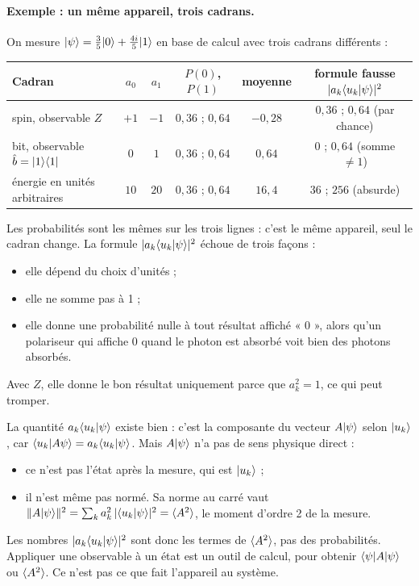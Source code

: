 \paragraph{Exemple : un même appareil, trois cadrans.} On mesure $\lvert \psi\rangle=\tfrac35\lvert 0\rangle+\tfrac{4i}5\lvert 1\rangle$ en base de calcul avec trois cadrans différents :
\begin{center}
\begin{tabular}{lccccc}
\toprule
Cadran & $a_0$ & $a_1$ & $P(0)$, $P(1)$ & moyenne & formule fausse $|a_k\langle u_k\vert \psi\rangle|^2$ \\
\midrule
spin, observable $Z$ & $+1$ & $-1$ & $0{,}36$ ; $0{,}64$ & $-0{,}28$ & $0{,}36$ ; $0{,}64$ (par chance) \\
bit, observable $\hat b=\lvert 1\rangle\langle 1\rvert$ & $0$ & $1$ & $0{,}36$ ; $0{,}64$ & $0{,}64$ & $0$ ; $0{,}64$ (somme $\neq1$) \\
énergie en unités arbitraires & $10$ & $20$ & $0{,}36$ ; $0{,}64$ & $16{,}4$ & $36$ ; $256$ (absurde) \\
\bottomrule
\end{tabular}
\end{center}
Les probabilités sont les mêmes sur les trois lignes : c'est le même appareil, seul le cadran change. La formule $|a_k\langle u_k\vert \psi\rangle|^2$ échoue de trois façons :
\begin{itemize}
\item elle dépend du choix d'unités ;
\item elle ne somme pas à 1 ;
\item elle donne une probabilité nulle à tout résultat affiché « 0 », alors qu'un polariseur qui affiche 0 quand le photon est absorbé voit bien des photons absorbés.
\end{itemize}
Avec $Z$, elle donne le bon résultat uniquement parce que $a_k^2=1$, ce qui peut tromper.

\begin{piege}
La quantité $a_k\langle u_k\vert \psi\rangle$ existe bien : c'est la composante du vecteur $A\lvert \psi\rangle$ selon $\lvert u_k\rangle$, car $\langle u_k\vert A\psi\rangle=a_k\langle u_k\vert \psi\rangle$. Mais $A\lvert \psi\rangle$ n'a pas de sens physique direct :
\begin{itemize}
\item ce n'est pas l'état après la mesure, qui est $\lvert u_k\rangle$ ;
\item il n'est même pas normé. Sa norme au carré vaut $\|A\lvert \psi\rangle\|^2=\sum_ka_k^2\,|\langle u_k\vert \psi\rangle|^2=\langle A^2\rangle$, le moment d'ordre 2 de la mesure.
\end{itemize}
Les nombres $|a_k\langle u_k\vert \psi\rangle|^2$ sont donc les termes de $\langle A^2\rangle$, pas des probabilités. Appliquer une observable à un état est un outil de calcul, pour obtenir $\langle \psi\rvert A\lvert \psi\rangle$ ou $\langle A^2\rangle$. Ce n'est pas ce que fait l'appareil au système.
\end{piege}

